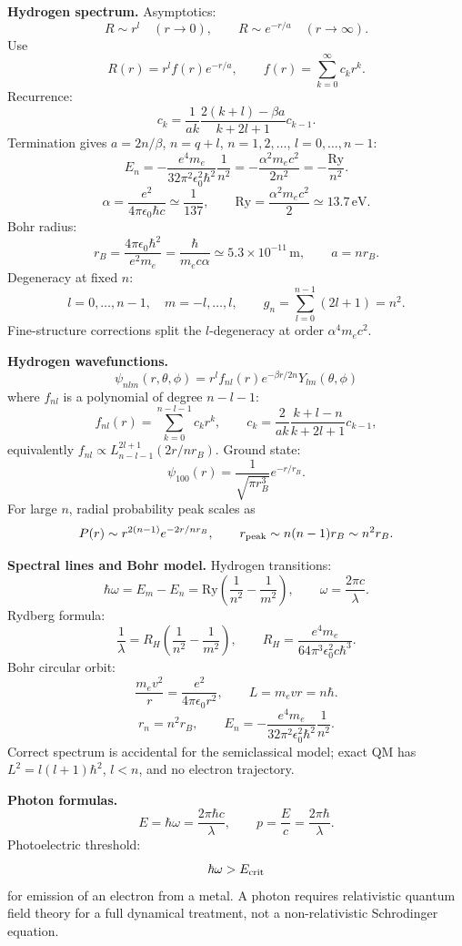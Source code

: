 \noindent\textbf{Hydrogen spectrum.}
Asymptotics:
\[
R\sim r^l\quad(r\to0),\qquad R\sim e^{-r/a}\quad(r\to\infty).
\]
Use
\[
R(r)=r^l f(r)e^{-r/a},\qquad f(r)=\sum_{k=0}^{\infty}c_kr^k.
\]
Recurrence:
\[
c_k=\frac{1}{ak}\frac{2(k+l)-\beta a}{k+2l+1}c_{k-1}.
\]
Termination gives \(a=2n/\beta\), \(n=q+l\), \(n=1,2,\ldots\), \(l=0,\ldots,n-1\):
\[
\boxed{E_n=-\frac{e^4m_e}{32\pi^2\epsilon_0^2\hbar^2}\frac{1}{n^2}}
=-\frac{\alpha^2m_ec^2}{2n^2}
=-\frac{\mathrm{Ry}}{n^2}.
\]
\[
\alpha=\frac{e^2}{4\pi\epsilon_0\hbar c}\simeq\frac{1}{137},\qquad
\mathrm{Ry}=\frac{\alpha^2m_ec^2}{2}\simeq13.7\,\mathrm{eV}.
\]
Bohr radius:
\[
\boxed{r_B=\frac{4\pi\epsilon_0\hbar^2}{e^2m_e}
=\frac{\hbar}{m_ec\alpha}\simeq5.3\times10^{-11}\,\mathrm{m}},
\qquad a=nr_B.
\]
Degeneracy at fixed \(n\):
\[
l=0,\ldots,n-1,\quad m=-l,\ldots,l,\qquad
\boxed{g_n=\sum_{l=0}^{n-1}(2l+1)=n^2}.
\]
Fine-structure corrections split the \(l\)-degeneracy at order \(\alpha^4m_ec^2\).

\noindent\textbf{Hydrogen wavefunctions.}
\[
\boxed{\psi_{nlm}(r,\theta,\phi)=r^l f_{nl}(r)e^{-\beta r/2n}Y_{lm}(\theta,\phi)}
\]
where \(f_{nl}\) is a polynomial of degree \(n-l-1\):
\[
f_{nl}(r)=\sum_{k=0}^{n-l-1}c_kr^k,\qquad
c_k=\frac{2}{ak}\frac{k+l-n}{k+2l+1}c_{k-1},
\]
equivalently \(f_{nl}\propto L_{n-l-1}^{2l+1}(2r/nr_B)\).
Ground state:
\[
\boxed{\psi_{100}(r)=\frac{1}{\sqrt{\pi r_B^3}}e^{-r/r_B}}.
\]
For large \(n\), radial probability peak scales as
\[
P(r)\sim r^{2(n-1)}e^{-2r/nr_B},\qquad
r_{\rm peak}\sim n(n-1)r_B\sim n^2r_B.
\]

\noindent\textbf{Spectral lines and Bohr model.}
Hydrogen transitions:
\[
\hbar\omega=E_m-E_n=\mathrm{Ry}\left(\frac{1}{n^2}-\frac{1}{m^2}\right),\qquad
\omega=\frac{2\pi c}{\lambda}.
\]
Rydberg formula:
\[
\frac{1}{\lambda}=R_H\left(\frac{1}{n^2}-\frac{1}{m^2}\right),\qquad
R_H=\frac{e^4m_e}{64\pi^3\epsilon_0^2c\hbar^3}.
\]
Bohr circular orbit:
\[
\frac{m_ev^2}{r}=\frac{e^2}{4\pi\epsilon_0r^2},\qquad
L=m_evr=n\hbar.
\]
\[
r_n=n^2r_B,\qquad
E_n=-\frac{e^4m_e}{32\pi^2\epsilon_0^2\hbar^2}\frac{1}{n^2}.
\]
Correct spectrum is accidental for the semiclassical model; exact QM has
\(L^2=l(l+1)\hbar^2\), \(l<n\), and no electron trajectory.

\noindent\textbf{Photon formulas.}
\[
E=\hbar\omega=\frac{2\pi\hbar c}{\lambda},\qquad
p=\frac{E}{c}=\frac{2\pi\hbar}{\lambda}.
\]
Photoelectric threshold:
\[
\hbar\omega>E_{\rm crit}
\]
for emission of an electron from a metal. A photon requires relativistic quantum
field theory for a full dynamical treatment, not a non-relativistic Schrodinger
equation.

